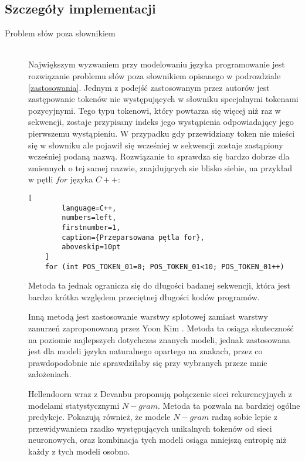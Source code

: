 \subsection{Szczegóły implementacji}
\label{oov}
\begin{description}
\item[Problem słów poza słownikiem]
\hfill \\
Największym wyzwaniem przy modelowaniu języka programowanie jest rozwiązanie problemu słów poza słownikiem opisanego w podrozdziale \ref{zastosowania}. 
Jednym z podejść zastosowanym przez autorów \cite{contextual_code_completion} jest zastępowanie tokenów nie występujących w słowniku 
specjalnymi tokenami pozycyjnymi. Tego typu tokenowi, który powtarza się więcej niż raz w sekwencji, zostaje przypisany indeks jego wystąpienia 
odpowiadający jego pierwszemu wystąpieniu. W przypadku gdy przewidziany token nie mieści się w słowniku ale pojawił się wcześniej w 
sekwencji zostaje zastąpiony wcześniej podaną nazwą. Rozwiązanie to sprawdza się bardzo dobrze dla zmiennych o tej samej nazwie, znajdujących 
sie blisko siebie, na przykład w pętli \begin{math}for\end{math} języka \begin{math}C++\end{math}: 
\begin{addmargin}[10mm]{0mm}
    \begin{lstlisting}[
        language=C++,
        numbers=left,
        firstnumber=1,
        caption={Przeparsowana pętla for},
        aboveskip=10pt
    ]
    for (int POS_TOKEN_01=0; POS_TOKEN_01<10; POS_TOKEN_01++)
    \end{lstlisting}
    \end{addmargin}
Metoda ta jednak ogranicza się do długości badanej sekwencji, która jest bardzo krótka względem przeciętnej długości kodów programów.


Inną metodą jest zastosowanie warstwy splotowej zamiast warstwy zanurzeń zaproponowaną przez Yoon Kim \cite{kim}. Metoda ta osiąga skuteczność 
na poziomie najlepszych dotychczas znanych modeli, jednak zastosowana jest dla modeli języka naturalnego opartego na znakach, przez co 
prawdopodobnie nie sprawdziłaby się przy wybranych przeze mnie założeniach. 

Hellendoorn wraz z Devanbu \cite{hellendoorn} proponują połączenie sieci rekurencyjnych z modelami statystycznymi \begin{math}N-gram\end{math}. Metoda ta pozwala na bardziej 
ogólne predykcje. Pokazują również, że modele \begin{math}N-gram\end{math} radzą sobie lepie z przewidywaniem rzadko występujących unikalnych tokenów od sieci neuronowych, 
oraz kombinacja tych modeli osiąga mniejszą entropię niż każdy z tych modeli osobno. 


\end{description}
